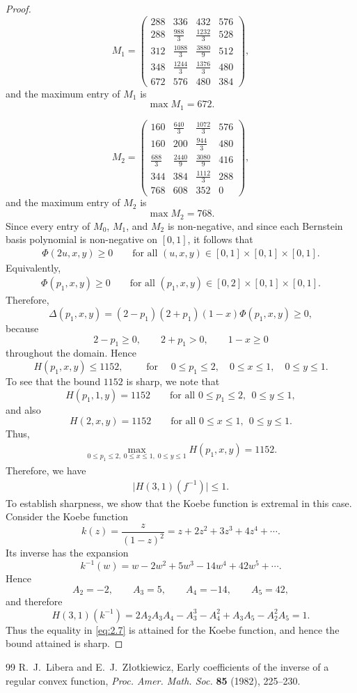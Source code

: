 \documentclass[10pt,a4paper]{amsart}
\begin{document}
\begin{proof}
		\[
		M_{1}=
		\begin{pmatrix}
			288&336&432&576\\[3mm]
			288&\frac{988}{3}&\frac{1232}{3}&528\\[3mm]
			312&\frac{1088}{3}&\frac{3880}{9}&512\\[3mm]
			348&\frac{1244}{3}&\frac{1376}{3}&480\\[3mm]
			672&576&480&384
		\end{pmatrix},
		\]
		and the maximum entry of \(M_{1}\) is
		\[
		\max M_{1}=672.
		\]
		
		\[
		M_{2}=
		\begin{pmatrix}
			160&\frac{640}{3}&\frac{1072}{3}&576\\[3mm]
			160&200&\frac{944}{3}&480\\[3mm]
			\frac{688}{3}&\frac{2440}{9}&\frac{3080}{9}&416\\[3mm]
			344&384&\frac{1112}{3}&288\\[3mm]
			768&608&352&0
		\end{pmatrix},
		\]
		and the maximum entry of \(M_{2}\) is
		\[
		\max M_{2}=768.
		\]
		Since every entry of \(M_{0}\), \(M_{1}\), and \(M_{2}\) is non-negative, and since each Bernstein basis polynomial is non-negative on \([0,1]\), it follows that
		\begin{align*}
		\Phi(2u,x,y)\ge 0
		\qquad \text{for all } (u,x,y)\in[0,1]\times[0, 1]\times[0, 1].
		\end{align*}
		Equivalently,
		\begin{align*}
		\Phi(p_{1},x,y)\ge 0
		\qquad \text{for all } (p_{1},x,y)\in[0,2]\times[0,1]\times[0,1].
		\end{align*}
		Therefore,
		\[
		\Delta(p_{1},x,y)
		=(2-p_{1})(2+p_{1})(1-x)\Phi(p_{1},x,y)\ge 0,
		\]
		because
		\[
		2-p_{1}\ge 0,\qquad 2+p_{1}>0,\qquad 1-x\ge 0
		\]
		throughout the domain. Hence
		\[
		H(p_{1},x,y)\le 1152, \qquad \text{ for } \quad 0\le p_{1}\le 2,\quad 0\le x\le 1,\quad 0\le y\le 1.
		\]
		To see that the bound $1152$ is sharp, we note that
		\[
		H(p_{1},1,y)=1152
		\qquad \text{for all } 0\le p_{1}\le 2,\ \ 0\le y\le 1,
		\]
		and also
		\[
		H(2,x,y)=1152
		\qquad \text{for all } 0\le x\le 1,\ \ 0\le y\le 1.
		\]
		Thus,
		\begin{align*}
		\max_{0\le p_{1}\le 2,\;0\le x\le 1,\;0\le y\le 1} H(p_{1},x,y)=1152.
		\end{align*}
	Therefore, we have
	\begin{align}\label{eq:2.7}
	\bigl|H(3,1)(f^{-1})\bigr|\le 1.
	\end{align}
To establish sharpness, we show that the Koebe function is extremal in this case. Consider the Koebe function
	\[
	k(z)=\frac{z}{(1-z)^{2}}=z+2z^{2}+3z^{3}+4z^{4}+\cdots .
	\]
	Its inverse has the expansion
	\[
	k^{-1}(w)=w-2w^{2}+5w^{3}-14w^{4}+42w^{5}+\cdots .
	\]
	Hence
	\[
	A_{2}=-2,\qquad A_{3}=5,\qquad A_{4}=-14,\qquad A_{5}=42,
	\]
	and therefore
	\[
	H(3,1)(k^{-1})
	=
	2A_{2}A_{3}A_{4}-A_{3}^{3}-A_{4}^{2}+A_{3}A_{5}-A_{2}^{2}A_{5}
	=1.
	\]
	Thus the equality in \eqref{eq:2.7} is attained for the Koebe function, and hence the bound attained is sharp. 
	\end{proof}

\begin{thebibliography}{99}
 R.~J.~Libera and E.~J.~Z{\l}otkiewicz, Early coefficients of the inverse of a regular convex function, \emph{Proc. Amer. Math. Soc.} \textbf{85} (1982), 225--230.
\end{thebibliography}
\end{document}
